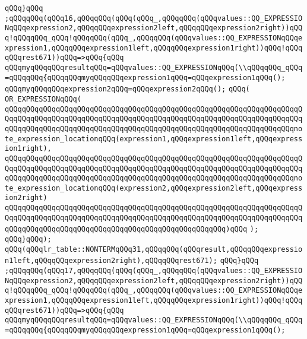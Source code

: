 \verb|qQQq}qQQq|\newline
\verb|;qQQqqQQq(qQQq16,qQQqqQQq(qQQq(qQQq_,qQQqqQQq(qQQqvalues::QQ_EXPRESSIONqQQqexpression2,qQQqqQQqexpression2left,qQQqqQQqexpression2right))qQQq!qQQqqQQq_qQQq!qQQqqQQq(qQQq_,qQQqqQQq(qQQqvalues::QQ_EXPRESSIONqQQqexpression1,qQQqqQQqexpression1left,qQQqqQQqexpression1right))qQQq!qQQqqQQqrest671))qQQq=>qQQq{qQQq|\newline
\verb|qQQqmyqQQqqQQqresultqQQq=qQQqvalues::QQ_EXPRESSIONqQQq(\\qQQqqQQq_qQQq=qQQqqQQq{qQQqqQQqmyqQQqqQQqexpression1qQQq=qQQqexpression1qQQq();|\newline
\verb|qQQqmyqQQqqQQqexpression2qQQq=qQQqexpression2qQQq();|\newline
\verb|qQQq(|\newline
\verb|OR_EXPRESSIONqQQq(|\newline
\verb|qQQqqQQqqQQqqQQqqQQqqQQqqQQqqQQqqQQqqQQqqQQqqQQqqQQqqQQqqQQqqQQqqQQqqQQqqQQqqQQqqQQqqQQqqQQqqQQqqQQqqQQqqQQqqQQqqQQqqQQqqQQqqQQqqQQqqQQqqQQqqQQqqQQqqQQqqQQqqQQqqQQqqQQqqQQqqQQqqQQqqQQqqQQqqQQqqQQqqQQqqQQqqQQqnote_expression_locationqQQq(expression1,qQQqexpression1left,qQQqexpression1right),|\newline
\verb|qQQqqQQqqQQqqQQqqQQqqQQqqQQqqQQqqQQqqQQqqQQqqQQqqQQqqQQqqQQqqQQqqQQqqQQqqQQqqQQqqQQqqQQqqQQqqQQqqQQqqQQqqQQqqQQqqQQqqQQqqQQqqQQqqQQqqQQqqQQqqQQqqQQqqQQqqQQqqQQqqQQqqQQqqQQqqQQqqQQqqQQqqQQqqQQqqQQqqQQqqQQqqQQqnote_expression_locationqQQq(expression2,qQQqexpression2left,qQQqexpression2right)|\newline
\verb|qQQqqQQqqQQqqQQqqQQqqQQqqQQqqQQqqQQqqQQqqQQqqQQqqQQqqQQqqQQqqQQqqQQqqQQqqQQqqQQqqQQqqQQqqQQqqQQqqQQqqQQqqQQqqQQqqQQqqQQqqQQqqQQqqQQqqQQqqQQqqQQqqQQqqQQqqQQqqQQqqQQqqQQqqQQqqQQqqQQqqQQqqQQqqQQq)qQQq|\newline
\verb|);|\newline
\verb|qQQq}qQQq);|\newline
\verb|qQQq(qQQqlr_table::NONTERMqQQq31,qQQqqQQq(qQQqresult,qQQqqQQqexpression1left,qQQqqQQqexpression2right),qQQqqQQqrest671);|\newline
\verb|qQQq}qQQq|\newline
\verb|;qQQqqQQq(qQQq17,qQQqqQQq(qQQq(qQQq_,qQQqqQQq(qQQqvalues::QQ_EXPRESSIONqQQqexpression2,qQQqqQQqexpression2left,qQQqqQQqexpression2right))qQQq!qQQqqQQq_qQQq!qQQqqQQq(qQQq_,qQQqqQQq(qQQqvalues::QQ_EXPRESSIONqQQqexpression1,qQQqqQQqexpression1left,qQQqqQQqexpression1right))qQQq!qQQqqQQqrest671))qQQq=>qQQq{qQQq|\newline
\verb|qQQqmyqQQqqQQqresultqQQq=qQQqvalues::QQ_EXPRESSIONqQQq(\\qQQqqQQq_qQQq=qQQqqQQq{qQQqqQQqmyqQQqqQQqexpression1qQQq=qQQqexpression1qQQq();|\newline
